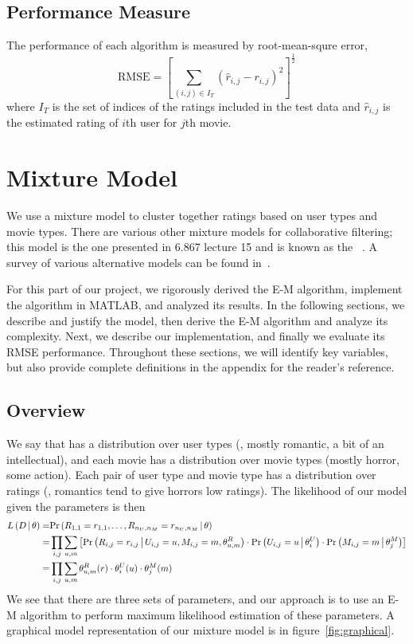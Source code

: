 \documentclass{article}
\begin{document}
\subsection{Performance Measure}
The performance of each algorithm is measured by root-mean-squre
error,
\begin{equation}
  \textrm{RMSE} = \left[
    \sum_{(i,j) \in I_T} ({\hat r}_{i,j} - r_{i,j})^2
  \right]^\frac{1}{2}
\end{equation}
where $I_T$ is the set of indices of the ratings included in the test
data and ${\hat r}_{i,j}$ is the estimated rating of $i$th user for
$j$th movie.

\section{Mixture Model}

We use a mixture model to cluster together ratings based on user types
and movie types. There are various other mixture models for
collaborative filtering; this model is the one presented in 6.867
lecture 15 and is known as the ~\cite{si03flexible}. A survey of various alternative models
can be found in~\cite{cmu-study}.

For this part of our project, we rigorously derived the E-M algorithm,
implement the algorithm in MATLAB, and analyzed its results. In the
following sections, we describe and justify the model, then derive the
E-M algorithm and analyze its complexity. Next, we describe our
implementation, and finally we evaluate its RMSE
performance. Throughout these sections, we will identify key
variables, but also provide complete definitions in the appendix for
the reader's reference.

\subsection{Overview}

We say that  has a distribution over user types (\eg,
mostly romantic, a bit of an intellectual), and each movie has a
distribution over movie types (mostly horror, some action). Each pair
of user type and movie type has a distribution over ratings (\eg,
romantics tend to give horrors low ratings). The likelihood of
our model given the parameters is then
\begin{align}
  {\ensuremath{ L \left( D \,\middle|\, \theta \right) }}
  =& {{\Pr \left(   R_{1,1} = r_{1,1}, \dots, R_{n_U,n_M} = r_{n_U,n_M}  \,\middle|\, 
    \theta   \right)}} \\
  =& \prod_{i,j} \sum_{u,m} \left[
    {{\Pr \left(   R_{i,j} = r_{i,j}  \,\middle|\,  U_{i,j} = u, M_{i,j} = m,
      \theta^R_{u,m}   \right)}} \cdot 
    {{\Pr \left(   U_{i,j} = u  \,\middle|\,  \theta^U_i   \right)}} \cdot
    {{\Pr \left(   M_{i,j} = m  \,\middle|\,  \theta^M_j   \right)}}
  \right] \\
  =& \prod_{i,j} \sum_{u,m}
  \theta^R_{u,m}(r) \cdot \theta^U_i(u) \cdot \theta^M_j(m)
\end{align}
We see that there are three sets of parameters, and our approach is to
use an E-M algorithm to perform maximum likelihood estimation of these
parameters. A graphical model representation of our mixture model is
in figure~\ref{fig:graphical}.
\end{document}
